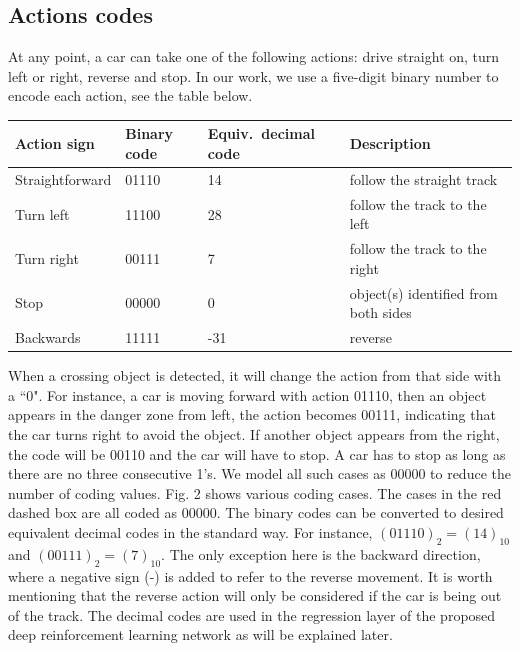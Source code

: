 \documentclass{svproc}
\begin{document}
	\subsection{Actions codes} 
	At any point, a car can take one of the following actions: drive straight on, turn left or right, reverse and stop. In our work, we use a five-digit binary number to encode each action, see the table below. %
	\vspace{-0.5cm}
	\begin{center}	\begin{tabular}{|C{2.5cm}|C{1.3cm}|C{2.5cm}|C{5.5cm}|}
			\hline
			\textbf{Action sign} & \textbf{Binary code} & \textbf{Equiv.\ decimal code} & \textbf{Description} \\ \hline
			Straightforward	& 01110	& 14 & follow the straight track\\ \hline
			Turn left	& 11100 & 28 & follow the track to the left \\ \hline
			Turn right	& 00111 & 7 & follow the track to the right \\ \hline
			Stop& 00000 & 0 & object(s) identified from both sides\\ \hline
			Backwards& 11111 & -31 & reverse \\ \hline
		\end{tabular}
	\end{center}
	When a crossing object is detected, it will change the action from that side with a ``0". For instance, a car is moving forward with action 01110, then an object appears in the danger zone from left, the action becomes 00111, indicating that the car turns right to avoid the object. If another object appears from the right, the code will be 00110 and the car will have to stop. A car has to stop as long as there are no three consecutive 1's. We model all such cases as 00000 to reduce the number of coding values. Fig. 2 shows various coding cases. The cases in the red dashed box are all coded as 00000.
	The binary codes can be converted to desired equivalent decimal codes in the standard way. For instance, $(01110)_2=(14)_{10}$ and $(00111)_2=(7)_{10}$. The only exception here is the backward direction, where a negative sign (-) is added to refer to the reverse movement. It is worth mentioning that the reverse action will only be considered if the car is being out of the track. The decimal codes are used in the regression layer of the proposed deep reinforcement learning network as will be explained later. 
\end{document}
